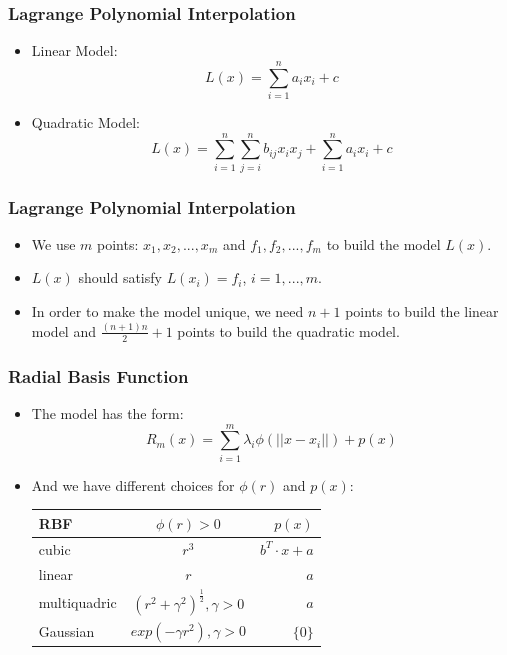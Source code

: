 \documentclass[hyperref={pdfpagelabels=false}]{beamer}
\begin{document}

\begin{frame}
\frametitle{Lagrange Polynomial Interpolation}
\begin{itemize}
\item Linear Model:
\begin{equation}
L(x)=\sum_{i=1}^na_ix_i+c
\end{equation}
\item Quadratic Model:
\begin{equation}
L(x)=\sum_{i=1}^n\sum_{j=i}^nb_{ij}x_ix_j+\sum_{i=1}^na_ix_i+c
\end{equation}
\end{itemize}
\end{frame}


\begin{frame}
\frametitle{Lagrange Polynomial Interpolation}
\begin{itemize}
\item We use $m$ points: $x_1, x_2,...,x_m$ and $f_1, f_2, ..., f_m$ to build the model $L(x)$.
\item $L(x)$ should satisfy $L(x_i)=f_i$, $i=1,...,m$.
\item In order to make the model unique, we need $n+1$ points to build the linear model and $\frac{(n+1)n}{2}+1$ points to build the quadratic model.
\end{itemize}
\end{frame}


\begin{frame}
\frametitle{Radial Basis Function}
\begin{itemize}
\item The model has the form:
\begin{equation}
R_m(x)=\sum_{i=1}^m\lambda_i\phi(||x-x_i||)+p(x)
\end{equation}
\item And we have different choices for $\phi(r)$ and $p(x)$:\\
\begin{center}
\begin{tabular}{l c r}
RBF & $\phi(r)>0$ & $p(x)$ \\ \hline
cubic & $r^3$ & $b^T\cdot x+a$ \\
linear & $r$ & $a$ \\
multiquadric & $(r^2+\gamma^2)^{\frac{1}{2}},\gamma>0$ & $a$ \\
Gaussian & $exp(-\gamma r^2),\gamma>0$ & $\{0\}$ 
\end{tabular}
\end{center}
\end{itemize}
\end{frame}
\end{document}
